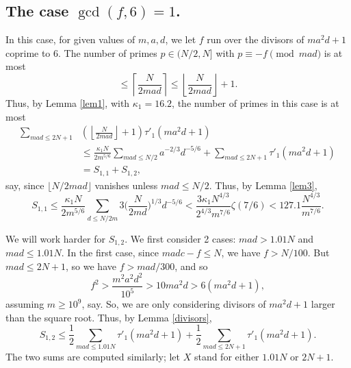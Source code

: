 \documentclass[12pt]{amsart}
\theoremstyle{definition}
\theoremstyle{remark}
\numberwithin{equation}{section}
\begin{document}
\subsection{The case $\gcd(f,6)=1$.}  In this case, for given values of $m,a,d$, we
let $f$ run over the divisors of $ma^2d+1$ coprime to 6.  The number of primes
$p\in(N/2,N]$ with $p\equiv-f\pmod{mad}$ is at most
$$ 
\le \left\lceil \frac{N}{2mad}\right\rceil\le\left\lfloor\frac{N}{2mad}\right\rfloor+1.
$$
Thus, by
 Lemma \ref{lem1}, with $\kappa_1=16.2$, the number of primes in this case is at most
 \begin{align*}
 \sum_{mad\le 2N+1}&\left(\left\lfloor\frac N{2mad}\right\rfloor+1\right)\tau'_1(ma^2d+1)\\
& \le \frac{\kappa_1N}{2m^{5/6}}\sum_{mad\le N/2}a^{-2/3}d^{-5/6}+\sum_{mad\le2N+1}\tau'_1(ma^2d+1)\\
 &=S_{1,1}+S_{1,2},
 \end{align*}
 say,  since $\lfloor N/2mad \rfloor $ vanishes unless $mad\le N/2$.
Thus, by Lemma \ref{lem3},
\[
S_{1,1}\le\frac{\kappa_1 N}{2m^{5/6}}\sum_{d\le N/2m}3\Big(\frac N{2md}\Big)^{1/3}d^{-5/6}
<\frac{3\kappa_1 N^{4/3}}{2^{4/3}m^{7/6}}\zeta(7/6)<127.1\frac{N^{4/3}}{m^{7/6}}.
\]

We will work harder for $S_{1,2}$.  We first consider 2 cases: $mad>1.01N$ and $mad\le1.01N$.
In the first case, since $madc-f\le N$, we have $f>N/100$.  But $mad\le2N+1$, so we have
$f>mad/300$, and so 
\begin{equation}
\label{eq:large}
f^2>\frac{m^2a^2d^2}{10^5}>10ma^2d>6(ma^2d+1),
\end{equation}
assuming $m\ge10^9$, say.  So, we are only considering divisors of $ma^2d+1$ larger than
the square root.  Thus, by Lemma \ref{divisors},
\begin{equation}
\label{eq:twosums}
S_{1,2}\le\frac12\sum_{mad\le 1.01N}\tau'_1(ma^2d+1)+\frac12\sum_{mad\le 2N+1}\tau'_1(ma^2d+1).
\end{equation}
The two sums are computed similarly; let $X$ stand for either $1.01N$ or $2N+1$.
\end{document}
